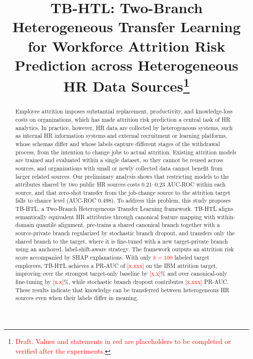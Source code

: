 \documentclass[runningheads]{llncs}
\newcommand{\tbd}[1]{\textcolor{red}{#1}}
\begin{document}
\title{TB-HTL: Two-Branch Heterogeneous Transfer Learning for Workforce Attrition Risk Prediction across Heterogeneous HR Data Sources\thanks{\textcolor{red}{Draft. Values and statements in red are placeholders to be completed or verified after the experiments.}}}

\maketitle

\begin{abstract}
Employee attrition imposes substantial replacement, productivity, and knowledge-loss costs on organizations, which has made attrition risk prediction a central task of HR analytics. In practice, however, HR data are collected by heterogeneous systems, such as internal HR information systems and external recruitment or learning platforms, whose schemas differ and whose labels capture different stages of the withdrawal process, from the intention to change jobs to actual attrition. Existing attrition models are trained and evaluated within a single dataset, so they cannot be reused across sources, and organizations with small or newly collected data cannot benefit from larger related sources. Our preliminary analysis shows that restricting models to the attributes shared by two public HR sources costs 0.21--0.23 AUC-ROC within each source, and that zero-shot transfer from the job-change source to the attrition target falls to chance level (AUC-ROC 0.498). To address this problem, this study proposes TB-HTL, a Two-Branch Heterogeneous Transfer Learning framework. TB-HTL aligns semantically equivalent HR attributes through canonical feature mapping with within-domain quantile alignment, pre-trains a shared canonical branch together with a source-private branch regularized by stochastic branch dropout, and transfers only the shared branch to the target, where it is fine-tuned with a new target-private branch using an anchored, label-shift-aware strategy. The framework outputs an attrition risk score accompanied by SHAP explanations. With only \tbd{$k=100$} labeled target employees, TB-HTL achieves a PR-AUC of \tbd{[x.xxx]} on the IBM attrition target, improving over the strongest target-only baseline by \tbd{[x.x]}\% and over canonical-only fine-tuning by \tbd{[x.x]}\%, while stochastic branch dropout contributes \tbd{[x.xxx]} PR-AUC. These results indicate that knowledge can be transferred between heterogeneous HR sources even when their labels differ in meaning.
\end{abstract}
\end{document}
